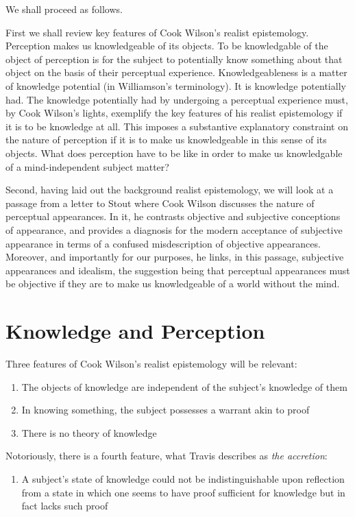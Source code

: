\documentclass[12pt]{article}
\begin{document}
We shall proceed as follows. 

First we shall review key features of Cook Wilson's realist epistemology. Perception makes us knowledgeable of its objects. To be knowledgable of the object of perception is for the subject to potentially know something about that object on the basis of their perceptual experience. Knowledgeableness is a matter of knowledge potential (in Williamson's \citeyear{Williamson:1990uq} terminology). It is knowledge potentially had. The knowledge potentially had by undergoing a perceptual experience must, by Cook Wilson's lights, exemplify the key features of his realist epistemology if it is to be knowledge at all. This imposes a substantive explanatory constraint on the nature of perception if it is to make us knowledgeable in this sense of its objects. What does perception have to be like in order to make us knowledgable of a mind-independent subject matter? 

Second, having laid out the background realist epistemology, we will look at a passage from a letter to Stout where Cook Wilson discusses the nature of perceptual appearances. In it, he contrasts objective and subjective conceptions of appearance, and provides a diagnosis for the modern acceptance of subjective appearance in terms of a confused misdescription of objective appearances. Moreover, and importantly for our purposes, he links, in this passage, subjective appearances and idealism, the suggestion being that perceptual appearances must be objective if they are to make us knowledgeable of a world without the mind.


\section{Knowledge and Perception} %
\label{sec:knowledge_and_perception}

Three features of Cook Wilson's realist epistemology will be relevant:
\begin{enumerate}[(1)]
	\item The objects of knowledge are independent of the subject's knowledge of them
	\item In knowing something, the subject possesses a warrant akin to proof
	\item There is no theory of knowledge
\end{enumerate}
Notoriously, there is a fourth feature, what Travis describes as \emph{the accretion}:
\begin{enumerate}[(4)]
	\item A subject's state of knowledge could not be indistinguishable upon reflection from a state in which one seems to have proof sufficient for knowledge but in fact lacks such proof
\end{enumerate}
\end{document}
